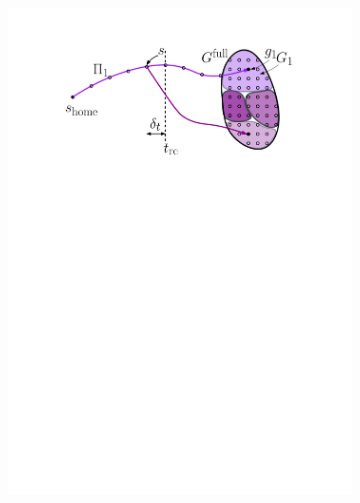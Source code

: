 \documentclass[conference]{IEEEtran}
\begin{document}
\begin{figure}[t]
\begin{subfigure}{0.225\textwidth}
        \includegraphics[width=\textwidth]{pre3}
        \caption{}
        \label{fig:pre3}
    \end{subfigure}
    \hspace{8mm}
    \begin{subfigure}{.225\textwidth}

\end{subfigure}
\end{figure}
\end{document}
